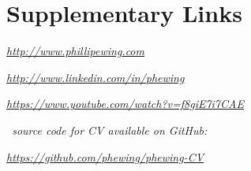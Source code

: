 \documentclass[letterpaper, oneside, 10pt]{article}
\begin{document}
\suppresstrue

\section*{Supplementary Links} %

\DotSep{0.25em}
\textit{\url{http://www.phillipewing.com}}

\DotSep{0.25em}
\textit{\url{http://www.linkedin.com/in/phewing}}

\DotSep{0.25em}
\textit{\url{https://www.youtube.com/watch?v=f8giE7i7CAE}}

\vfill

\begin{center}

  \textit{\LaTeXe\ source code for CV available on GitHub:}

  \textit{\url{https://github.com/phewing/phewing-CV}}

\end{center}
\end{document}
